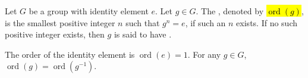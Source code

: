 \begin{definition} \label{definition:order_of_a_group_element}
Let $G$ be a group with identity element $e$. Let $g \in G$. The , denoted by \hl{$\operatorname{ord}(g)$}, is the smallest positive integer $n$ such that $g^n = e$, if such an $n$ exists. If no such positive integer exists, then $g$ is said to have .

The order of the identity element is $\operatorname{ord}(e) = 1$. For any $g \in G$, $\operatorname{ord}(g) = \operatorname{ord}(g^{-1})$.
\end{definition}
